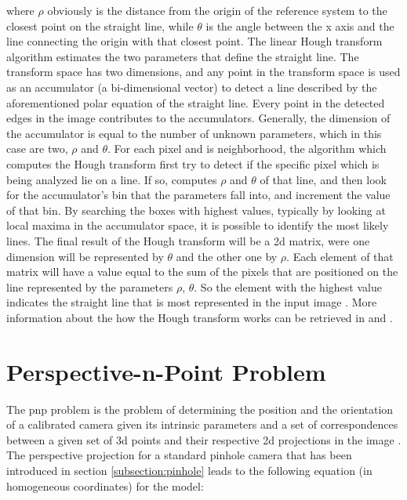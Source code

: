 where $\rho$ obviously is the distance from the origin of the reference system to the closest point on the straight line, while $\theta$ is the angle between the x axis and the line connecting the origin with that closest point.
The linear Hough transform algorithm estimates the two parameters that define the straight line. The transform space has two dimensions, and any point in the transform space is used as an accumulator (a bi-dimensional vector) to detect a line described by the aforementioned polar equation of the straight line. Every point in the detected edges in the image contributes to the accumulators. Generally, the dimension of the accumulator is equal to the number of unknown parameters, which in this case are two, $\rho$ and $\theta$. For each pixel and is neighborhood, the algorithm which computes the Hough transform first try to detect if the specific pixel which is being analyzed lie on a line. If so, computes $\rho$ and $\theta$ of that line, and then look for the accumulator's bin that the parameters fall into, and increment the value of that bin.
By searching the boxes with highest values, typically by looking at local maxima in the accumulator space, it is possible to identify the most likely lines. The final result of the Hough transform will be a \acrshort{2d} matrix, were one dimension will be represented by $\theta$ and the other one by $\rho$.
Each element of that matrix will have a value equal to the sum of the pixels that are positioned on the line represented by the parameters $\rho$, $\theta$. So the element with the highest value indicates the straight line that is most represented in the input image \cite{houghreport}. More information about the how the Hough transform works can be retrieved in \cite{10.1145/361237.361242} and \cite{osti_4746348}.

\section{Perspective-n-Point Problem}
The \acrshort{pnp} problem is the problem of determining the position and the orientation of a calibrated camera given its intrinsic parameters and a set of correspondences between a given set of \acrshort{3d} points and their respective \acrshort{2d} projections in the image \cite{10.1007/s11263-008-0152-6}.
The perspective projection for a standard pinhole camera that has been introduced in section \ref{subsection:pinhole} leads to the following equation (in homogeneous coordinates) for the model:

